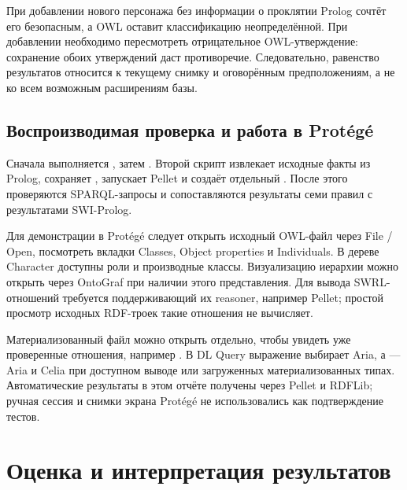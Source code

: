 При добавлении нового персонажа без информации о проклятии Prolog сочтёт его безопасным, а OWL оставит классификацию неопределённой. При добавлении  необходимо пересмотреть отрицательное OWL-утверждение: сохранение обоих утверждений даст противоречие. Следовательно, равенство результатов относится к текущему снимку и оговорённым предположениям, а не ко всем возможным расширениям базы.

\subsection{Воспроизводимая проверка и работа в Protégé}
Сначала выполняется , затем . Второй скрипт извлекает исходные факты из Prolog, сохраняет , запускает Pellet и создаёт отдельный . После этого проверяются SPARQL-запросы и сопоставляются результаты семи правил с результатами SWI-Prolog.

Для демонстрации в Protégé следует открыть исходный OWL-файл через File / Open, посмотреть вкладки Classes, Object properties и Individuals. В дереве Character доступны роли и производные классы. Визуализацию иерархии можно открыть через OntoGraf при наличии этого представления. Для вывода SWRL-отношений требуется поддерживающий их reasoner, например Pellet; простой просмотр исходных RDF-троек такие отношения не вычисляет.

Материализованный файл можно открыть отдельно, чтобы увидеть уже проверенные отношения, например . В DL Query выражение  выбирает Aria, а  --- Aria и Celia при доступном выводе или загруженных материализованных типах. Автоматические результаты в этом отчёте получены через Pellet и RDFLib; ручная сессия и снимки экрана Protégé не использовались как подтверждение тестов.

\section{Оценка и интерпретация результатов}
